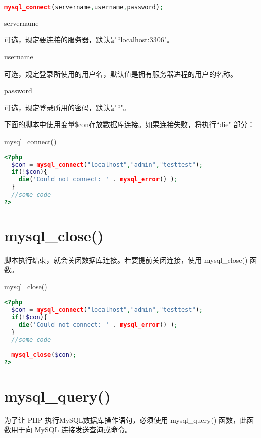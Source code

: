 \begin{lstlisting}[language=PHP]
mysql_connect(servername,username,password);
\end{lstlisting}

\begin{compactitem}
\item servername

可选，规定要连接的服务器，默认是``localhost:3306"。
\item username

可选，规定登录所使用的用户名，默认值是拥有服务器进程的用户的名称。
\item password

可选，规定登录所用的密码，默认是``"。
\end{compactitem}

下面的脚本中使用变量\$con存放数据库连接。如果连接失败，将执行``die" 部分：

\begin{example}
mysql\_connect()
\begin{lstlisting}[language=PHP]
<?php
  $con = mysql_connect("localhost","admin","testtest");
  if(!$con){
    die('Could not connect: ' . mysql_error() );
  }
  //some code
?>
\end{lstlisting}
\end{example}

\section{mysql\_close()}

脚本执行结束，就会关闭数据库连接。若要提前关闭连接，使用 mysql\_close() 函数。


\begin{example}
mysql\_close()
\begin{lstlisting}[language=PHP]
<?php
  $con = mysql_connect("localhost","admin","testtest");
  if(!$con){
    die('Could not connect: ' . mysql_error() );
  }
  //some code
  
  mysql_close($con);
?>
\end{lstlisting}
\end{example}


\section{mysql\_query()}

为了让 PHP 执行MySQL数据库操作语句，必须使用 mysql\_query() 函数，此函数用于向 MySQL 连接发送查询或命令。

